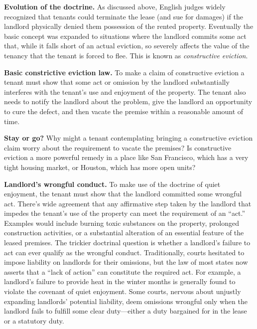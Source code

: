 
\item \textbf{Evolution of the doctrine.}  As discussed above, English judges
widely recognized that tenants could terminate the lease (and sue for damages)
if the landlord physically denied them possession of the rented property. 
Eventually the basic concept was expanded to situations where the landlord
commits some act that, while it falls short of an actual eviction, so severely
affects the value of the tenancy that the tenant is forced to flee.  This is
known as \textit{constructive eviction}.  


\item \textbf{Basic constrictive eviction law.} To make a claim of constructive
eviction a tenant must show that some act or omission by the landlord
substantially interferes with the tenant's use and enjoyment of the property. 
The tenant also needs to notify the landlord about the problem, give the
landlord an opportunity to cure the defect, and then vacate the premise within
a reasonable amount of time.


\item \textbf{Stay or go?} Why might a tenant contemplating bringing a
constructive eviction claim worry about the requirement to vacate the premises?
 Is constructive eviction a more powerful remedy in a place like San Francisco,
which has a very tight housing market, or Houston, which has more open units?  


\item \textbf{Landlord's wrongful conduct.}  To make use of the doctrine of
quiet enjoyment, the tenant must show that the landlord committed some wrongful
act.  There's wide agreement that any affirmative step taken by the landlord
that impedes the tenant's use of the property can meet the requirement of an
``act.''  Examples would include burning toxic substances on the property,
prolonged construction activities, or a substantial alteration of an essential
feature of the leased premises.  The trickier doctrinal question is whether a
landlord's failure to act can ever qualify as the wrongful conduct. 
Traditionally, courts hesitated to impose liability on landlords for their
omissions, but the law of most states now asserts that a ``lack of action'' can
constitute the required act. For example, a landlord's failure to provide heat
in the winter months is generally found to violate the covenant of quiet
enjoyment. Some courts, nervous about unjustly expanding landlords' potential
liability, deem omissions wrongful only when the landlord fails to fulfill some
clear duty---either a duty bargained for in the lease or a statutory duty.


